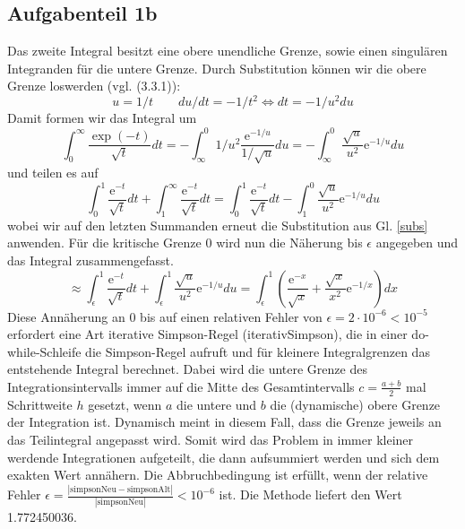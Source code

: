 \subsection*{Aufgabenteil 1b}
Das zweite Integral besitzt eine obere unendliche Grenze, sowie einen singulären Integranden für die untere Grenze.
Durch Substitution können wir die obere Grenze loswerden (vgl. (3.3.1)\cite[37]{script}):
\begin{equation}
u = 1/t \qquad du/dt = - 1/t^2 \Leftrightarrow dt = -1/u^2 du
\label{subs}
\end{equation}
Damit formen wir das Integral um
\begin{equation*}
\int_0^{\infty} \frac{\exp(-t)}{\sqrt{t}}dt = - \int_{\infty}^0 1/u^2 \frac{\mathup{e}^{-1/u}}{1/\sqrt{u}} du= - \int_{\infty}^0 \frac{\sqrt{u}}{u^2} \mathup{e}^{-1/u} du
\end{equation*}
und teilen es auf
\begin{equation*}
\int_0^1 \frac{\mathup{e}^{-t}}{\sqrt{t}} dt + \int_1^{\infty} \frac{\mathup{e}^{-t}}{\sqrt{t}}dt = \int_0^1 \frac{\mathup{e}^{-t}}{\sqrt{t}} dt - \int_{1}^0 \frac{\sqrt{u}}{u^2} \mathup{e}^{-1/u} du
\end{equation*}
wobei wir auf den letzten Summanden erneut die Substitution aus Gl. \eqref{subs} anwenden. Für die kritische Grenze 0 wird nun die Näherung bis $\epsilon$ angegeben und das Integral zusammengefasst.
\begin{equation*}
\approx \int_{\epsilon}^1 \frac{\mathup{e}^{-t}}{\sqrt{t}} dt+ \int_{\epsilon}^1 \frac{\sqrt{u}}{u^2} \mathup{e}^{-1/u} du = \int_{\epsilon}^1 \left(\frac{\mathup{e}^{-x}}{\sqrt{x}}+ \frac{\sqrt{x}}{x^2} \mathup{e}^{-1/x}\right) dx
\end{equation*}
Diese Annäherung an 0 bis auf einen relativen Fehler von $\epsilon = 2 \cdot 10^{-6} < 10^{-5}$ erfordert eine Art iterative Simpson-Regel (iterativSimpson), die in einer do-while-Schleife die Simpson-Regel aufruft und für kleinere Integralgrenzen das entstehende Integral berechnet. Dabei wird die untere Grenze des Integrationsintervalls immer auf die Mitte des Gesamtintervalls $c = \frac{a+b}{2}$ mal Schrittweite $h$ gesetzt, wenn $a$ die untere und $b$ die (dynamische) obere Grenze der Integration ist. Dynamisch meint in diesem Fall, dass die Grenze jeweils an das Teilintegral angepasst wird. Somit wird das Problem in immer kleiner werdende Integrationen aufgeteilt, die dann aufsummiert werden und sich dem exakten Wert annähern.
Die Abbruchbedingung ist erfüllt, wenn der relative Fehler $\epsilon = \frac{|\text{simpsonNeu}-\text{simpsonAlt}|}{|\text{simpsonNeu}|} < 10^{-6}$ ist. Die Methode liefert den Wert 1.772450036.

